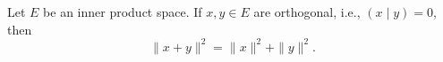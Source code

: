Let $E$ be an inner product space. If $x, y \in E$ are orthogonal, i.e., $(x \mid y) = 0$, then
$$\|x + y\|^2 = \|x\|^2 + \|y\|^2.$$
